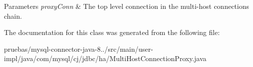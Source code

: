 \begin{DoxyParams}{Parameters}
{\em proxy\+Conn} & The top level connection in the multi-\/host connections chain. \\
\hline
\end{DoxyParams}


The documentation for this class was generated from the following file\+:\begin{DoxyCompactItemize}
\item 
pruebas/mysql-\/connector-\/java-\/8../src/main/user-\/impl/java/com/mysql/cj/jdbc/ha/Multi\+Host\+Connection\+Proxy.\+java\end{DoxyCompactItemize}
